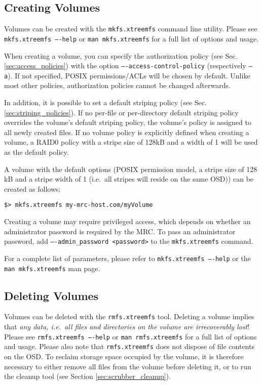 \documentclass[a4paper,10pt]{book}
\begin{document}
\subsection{Creating Volumes}
\label{sec:create_volume}

Volumes can be created with the \texttt{mkfs.xtreemfs} command line utility. Please see \texttt{mkfs.xtreemfs ----help} or \texttt{man mkfs.xtreemfs} for a full list of options and usage.

When creating a volume, you can specify the authorization policy (see Sec. \ref{sec:access_policies}) with the option \texttt{----access-control-policy} (respectively \texttt{--a}). If not specified, POSIX permissions/ACLs will be chosen by default. Unlike most other policies, authorization policies cannot be changed afterwards.

In addition, it is possible to set a default striping policy (see Sec. \ref{sec:striping_policies}). If no per-file or per-directory default striping policy overrides the volume's default striping policy, the volume's policy is assigned to all newly created files. If no volume policy is explicitly defined when creating a volume, a RAID0 policy with a stripe size of 128kB and a width of 1 will be used as the default policy.

A volume with the default options (POSIX permission model, a stripe size of 128 kB and a stripe width of 1 (i.e.\ all stripes will reside on the same OSD)) can be created as follows:


\begin{verbatim}
$> mkfs.xtreemfs my-mrc-host.com/myVolume
\end{verbatim}

Creating a volume may require privileged access, which depends on whether an administrator password is required by the MRC. To pass an administrator password, add \texttt{----admin\_password <password>} to the \texttt{mkfs.xtreemfs} command.

For a complete list of parameters, please refer to \texttt{mkfs.xtreemfs ----help} or the \texttt{man mkfs.xtreemfs} man page.

\subsection{Deleting Volumes}

Volumes can be deleted with the \texttt{rmfs.xtreemfs} tool. Deleting a volume implies that \emph{any data, i.e.\ all files and directories on the volume are irrecoverably lost}! Please see \texttt{rmfs.xtreemfs ----help} or \texttt{man rmfs.xtreemfs} for a full list of options and usage. Please also note that \texttt{rmfs.xtreemfs} does not dispose of file contents on the OSD. To reclaim storage space occupied by the volume, it is therefore necessary to either remove all files from the volume before deleting it, or to run the cleanup tool (see Section \ref{sec:scrubber_cleanup}).
\end{document}
